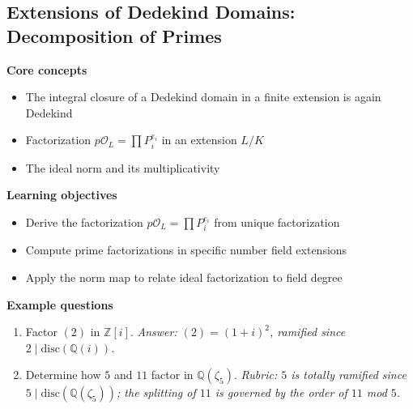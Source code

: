 \documentclass[11pt]{article}
\newcommand{\Q}{\mathbb{Q}}
\newcommand{\Z}{\mathbb{Z}}
\newcommand{\OL}{\mathcal{O}_L}
\begin{document}
\subsection{Extensions of Dedekind Domains: Decomposition of Primes}
\textbf{Core concepts}
\begin{itemize}[noitemsep]
  \item The integral closure of a Dedekind domain in a finite extension is again Dedekind
  \item Factorization $p\OL = \prod P_i^{e_i}$ in an extension $L/K$
  \item The ideal norm and its multiplicativity
\end{itemize}
\textbf{Learning objectives}
\begin{itemize}[noitemsep]
  \item Derive the factorization $p\OL = \prod P_i^{e_i}$ from unique factorization
  \item Compute prime factorizations in specific number field extensions
  \item Apply the norm map to relate ideal factorization to field degree
\end{itemize}
\textbf{Example questions}
\begin{enumerate}[noitemsep]
  \item[Q1 (foundational).] Factor $(2)$ in $\Z[i]$. \emph{Answer: $(2) = (1+i)^2$, ramified since $2 \mid \mathrm{disc}(\Q(i))$.}
  \item[Q2 (advanced).] Determine how $5$ and $11$ factor in $\Q(\zeta_5)$. \emph{Rubric: $5$ is totally ramified since $5\mid \mathrm{disc}(\Q(\zeta_5))$; the splitting of $11$ is governed by the order of $11$ mod $5$.}
\end{enumerate}

\end{document}
